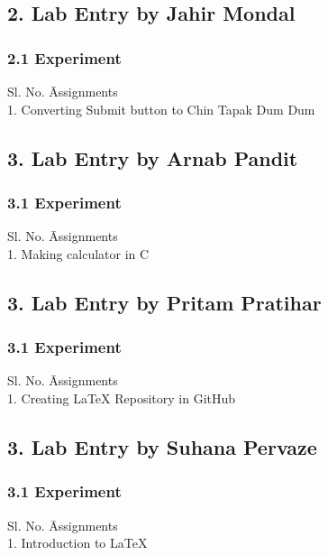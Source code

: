 \documentclass[a4paper,12pt]{article}
\begin{document}
\subsection*{2. Lab Entry by Jahir Mondal}
\subsubsection*{2.1 Experiment}
\begin{tabbing}
    Sl. No. \hspace{2cm} \= Assignments \\
    1. \> Converting Submit button to Chin Tapak Dum Dum \\
\end{tabbing}

\subsection*{3. Lab Entry by Arnab Pandit}
\subsubsection*{3.1 Experiment}
\begin{tabbing}
    Sl. No. \hspace{2cm} \= Assignments \\
    1. \> Making calculator in C \\
\end{tabbing}

\subsection*{3. Lab Entry by Pritam Pratihar}
\subsubsection*{3.1 Experiment}
\begin{tabbing}
    Sl. No. \hspace{2cm} \= Assignments \\
    1. \> Creating LaTeX Repository in GitHub \\
\end{tabbing}

\subsection*{3. Lab Entry by Suhana Pervaze}
\subsubsection*{3.1 Experiment}
\begin{tabbing}
    Sl. No. \hspace{2cm} \= Assignments \\
    1. \> Introduction to LaTeX \\
\end{tabbing}
\end{document}

